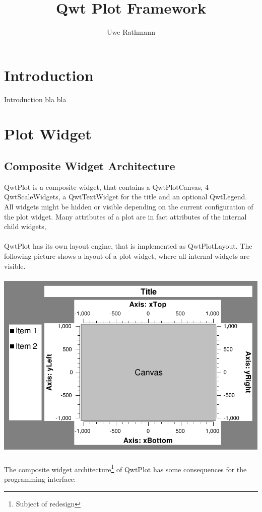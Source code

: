 \documentclass[12pt,a4paper]{book}
\author{Uwe Rathmann}
\title{Qwt Plot Framework}
\begin{document}
\maketitle
\pagestyle{headings}

\tableofcontents

\chapter{Introduction}

Introduction bla bla

\chapter{Plot Widget}

\section{Composite Widget Architecture}

QwtPlot is a composite widget, that contains a QwtPlotCanvas, 
4 QwtScaleWidgets, a QwtTextWidget for the title and an optional QwtLegend. 
All widgets might be hidden or visible depending on the current configuration 
of the plot widget. Many attributes of a plot are in fact 
attributes of the internal child widgets,
\\
\\
QwtPlot has its own layout engine, that is implemented as QwtPlotLayout. 
The following picture shows a layout of a plot widget, where all internal widgets are visible.
\\
\\
\includegraphics[scale=1.0]{plotlayout.pdf}
\\
\\
The composite widget architecture\footnote{Subject of redesign} 
of QwtPlot has some consequences for the programming interface:
\end{document}
